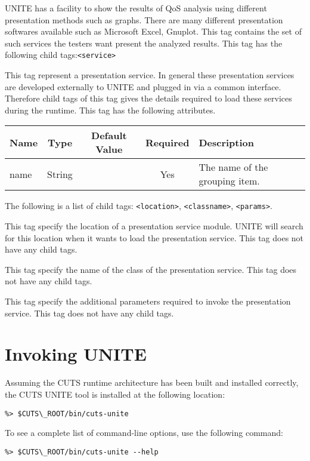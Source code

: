 
UNITE has a facility to show the results of QoS analysis using different 
presentation methods such as graphs. There are many different presentation 
softwares available such as Microsoft Excel, Gnuplot. This tag contains the 
set of such services the testers want present the analyzed results. This tag has 
the following child tags:\texttt{<service>}


This tag represent a presentation service. In general these presentation services 
are developed externally to UNITE and plugged in via a common interface.
Therefore child tags of this tag gives the details required to load these services 
during the runtime. This tag has the following attributes.

\begin{table}
 \begin{tabular}{lcccl}
  \hline
  \textbf{Name} & \textbf{Type} & \textbf{Default Value} & \textbf{Required} & \textbf{Description} \\
  \hline
  name & String  & & Yes & The name of the grouping item. \\
  \end{tabular}
\end{table}

\noindent The following is a list of child tags:
\texttt{<location>}, \texttt{<classname>}, \texttt{<params>}.


This tag specify the location of a presentation service module. UNITE 
will search for this location when it wants to load the presentation 
service. This tag does not have any child tags.


This tag specify the name of the class of the presentation 
service. This tag does not have any child tags.


This tag specify the additional parameters required to invoke 
the presentation service. This tag does not have any child tags.

\section{Invoking UNITE}
\label{sec:unite-invoke}

Assuming the CUTS runtime architecture has been built and installed 
correctly, the CUTS UNITE tool is installed at the following 
location:
\begin{lstlisting}
%> $CUTS\_ROOT/bin/cuts-unite
\end{lstlisting}
To see a complete list of command-line options, use the following 
command:
\begin{lstlisting}
%> $CUTS\_ROOT/bin/cuts-unite --help
\end{lstlisting}

